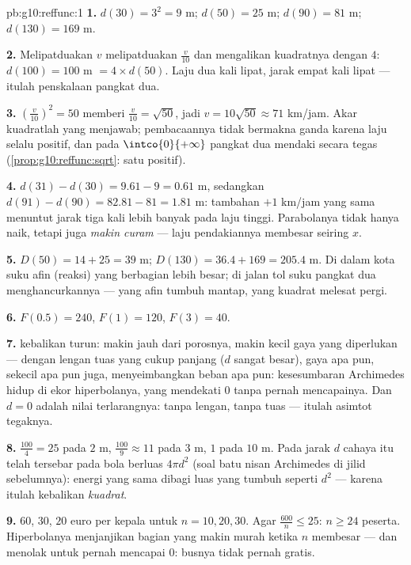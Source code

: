 \begin{solution}{pb:g10:reffunc:1}
\textbf{1.} $d(30) = 3^2 = 9$ m; $d(50) = 25$ m; $d(90) =
81$ m; $d(130) = 169$ m.

\textbf{2.} Melipatduakan $v$ melipatduakan $\frac v{10}$ dan mengalikan
kuadratnya dengan $4$: $d(100) = 100$ m $= 4 \times d(50)$. Laju dua kali
lipat, jarak empat kali lipat --- itulah penskalaan  pangkat dua.

\textbf{3.} $\left(\frac{v}{10}\right)^2 = 50$ memberi
$\frac{v}{10} = \sqrt{50}$, jadi $v = 10\sqrt{50} \approx 71$
km/jam. Akar kuadratlah yang menjawab; pembacaannya tidak bermakna ganda
karena laju selalu positif, dan pada
$\intco{0}{+\infty}$  pangkat dua mendaki secara tegas
(\cref{prop:g10:reffunc:sqrt}: satu  positif).

\textbf{4.} $d(31) - d(30) = 9.61 - 9 = 0.61$ m, sedangkan
$d(91) - d(90) = 82.81 - 81 = 1.81$ m: tambahan $+1$ km/jam yang sama
menuntut jarak tiga kali lebih banyak pada laju tinggi. Parabolanya tidak
hanya naik, tetapi juga \emph{makin curam} --- laju pendakiannya membesar
seiring $x$.

\textbf{5.} $D(50) = 14 + 25 = 39$ m; $D(130) = 36.4 + 169 =
205.4$ m. Di dalam kota suku afin (reaksi) yang berbagian lebih besar;
di jalan tol suku pangkat dua menghancurkannya --- yang afin
tumbuh mantap, yang kuadrat melesat pergi.

\textbf{6.} $F(0.5) = 240$, $F(1) = 120$, $F(3) = 40$.

\textbf{7.}  kebalikan turun: makin jauh dari
porosnya, makin kecil gaya yang diperlukan --- dengan lengan tuas yang
cukup panjang ($d$ sangat besar), gaya apa pun, sekecil apa pun juga,
menyeimbangkan beban apa pun: kesesumbaran Archimedes hidup di ekor
hiperbolanya, yang mendekati $0$ tanpa pernah mencapainya. Dan $d = 0$
adalah nilai terlarangnya: tanpa lengan, tanpa tuas --- itulah asimtot tegaknya.

\textbf{8.} $\frac{100}{4} = 25$ pada $2$ m,
$\frac{100}{9} \approx 11$ pada $3$ m, $1$ pada $10$ m. Pada jarak
$d$ cahaya itu telah tersebar pada bola berluas $4\pi d^2$
(soal batu nisan Archimedes di jilid sebelumnya): energi yang sama dibagi
luas yang tumbuh seperti $d^2$ --- karena itulah kebalikan \emph{kuadrat}.

\textbf{9.} $60$, $30$, $20$ euro per kepala untuk $n = 10, 20,
30$. Agar $\frac{600}{n} \leq 25$: $n \geq 24$ peserta.
Hiperbolanya menjanjikan bagian yang makin murah ketika $n$ membesar ---
dan menolak untuk pernah mencapai $0$: busnya tidak pernah gratis.


\end{solution}
